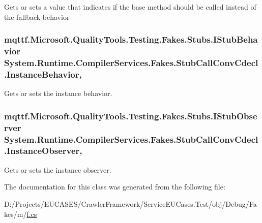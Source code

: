 Gets or sets a value that indicates if the base method should be called instead of the fallback behavior

\hypertarget{class_system_1_1_runtime_1_1_compiler_services_1_1_fakes_1_1_stub_call_conv_cdecl_a738a75f0263bc425e76eb1b7b3dcb050}{
\subsubsection[{Instance\-Behavior}]{\setlength{\rightskip}{0pt plus 5cm}mqttf.\-Microsoft.\-Quality\-Tools.\-Testing.\-Fakes.\-Stubs.\-I\-Stub\-Behavior System.\-Runtime.\-Compiler\-Services.\-Fakes.\-Stub\-Call\-Conv\-Cdecl.\-Instance\-Behavior\hspace{0.3cm}{\ttfamily [get]}, {\ttfamily [set]}}}\label{class_system_1_1_runtime_1_1_compiler_services_1_1_fakes_1_1_stub_call_conv_cdecl_a738a75f0263bc425e76eb1b7b3dcb050}


Gets or sets the instance behavior.

\hypertarget{class_system_1_1_runtime_1_1_compiler_services_1_1_fakes_1_1_stub_call_conv_cdecl_a2a51cff04206a0828bcd6d77e3f7dcb7}{
\subsubsection[{Instance\-Observer}]{\setlength{\rightskip}{0pt plus 5cm}mqttf.\-Microsoft.\-Quality\-Tools.\-Testing.\-Fakes.\-Stubs.\-I\-Stub\-Observer System.\-Runtime.\-Compiler\-Services.\-Fakes.\-Stub\-Call\-Conv\-Cdecl.\-Instance\-Observer\hspace{0.3cm}{\ttfamily [get]}, {\ttfamily [set]}}}\label{class_system_1_1_runtime_1_1_compiler_services_1_1_fakes_1_1_stub_call_conv_cdecl_a2a51cff04206a0828bcd6d77e3f7dcb7}


Gets or sets the instance observer.



The documentation for this class was generated from the following file\-:\begin{DoxyCompactItemize}
\item 
D\-:/\-Projects/\-E\-U\-C\-A\-S\-E\-S/\-Crawler\-Framework/\-Service\-E\-U\-Cases.\-Test/obj/\-Debug/\-Fakes/m/\hyperlink{m_2f_8cs}{f.\-cs}\end{DoxyCompactItemize}
